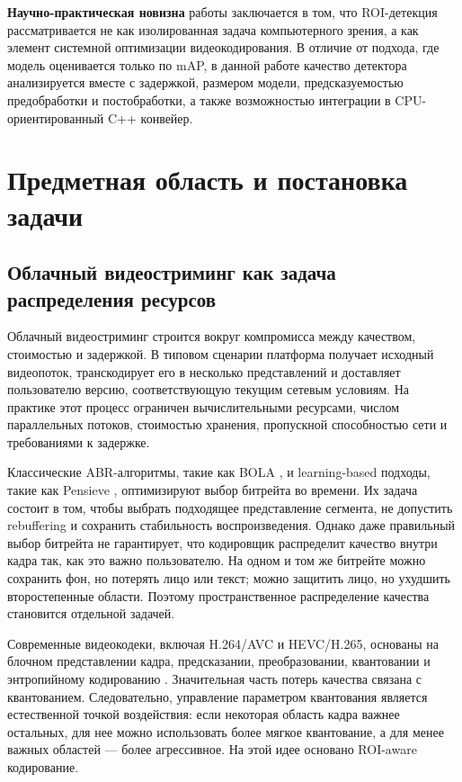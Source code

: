 \documentclass[12pt,a4paper,oneside,openany]{report}
\newcommand{\important}[1]{\textbf{#1}}
\begin{document}
\important{Научно-практическая новизна} работы заключается в том, что ROI-детекция
рассматривается не как изолированная задача компьютерного зрения, а как элемент системной
оптимизации видеокодирования. В отличие от подхода, где модель оценивается только по mAP, в
данной работе качество детектора анализируется вместе с задержкой, размером модели,
предсказуемостью предобработки и постобработки, а также возможностью интеграции в
CPU-ориентированный C++ конвейер.


\chapter{Предметная область и постановка задачи}


\section{Облачный видеостриминг как задача распределения ресурсов}

Облачный видеостриминг строится вокруг компромисса между качеством, стоимостью и задержкой. В
типовом сценарии платформа получает исходный видеопоток, транскодирует его в несколько
представлений и доставляет пользователю версию, соответствующую текущим сетевым условиям. На
практике этот процесс ограничен вычислительными ресурсами, числом параллельных потоков,
стоимостью хранения, пропускной способностью сети и требованиями к задержке.

Классические ABR-алгоритмы, такие как BOLA \cite{bola}, и learning-based подходы, такие как
Pensieve \cite{pensieve}, оптимизируют выбор битрейта во времени. Их задача состоит в том, чтобы
выбрать подходящее представление сегмента, не допустить rebuffering и сохранить стабильность
воспроизведения. Однако даже правильный выбор битрейта не гарантирует, что кодировщик
распределит качество внутри кадра так, как это важно пользователю. На одном и том же битрейте
можно сохранить фон, но потерять лицо или текст; можно защитить лицо, но ухудшить второстепенные
области. Поэтому пространственное распределение качества становится отдельной задачей.

Современные видеокодеки, включая H.264/AVC и HEVC/H.265, основаны на блочном представлении
кадра, предсказании, преобразовании, квантовании и энтропийному кодированию
\cite{h264,hevc,vatolin,itmo_compression}. Значительная часть потерь качества связана с
квантованием. Следовательно, управление параметром квантования является естественной точкой
воздействия: если некоторая область кадра важнее остальных, для нее можно использовать более
мягкое квантование, а для менее важных областей --- более агрессивное. На этой идее основано
ROI-aware кодирование.
\end{document}
